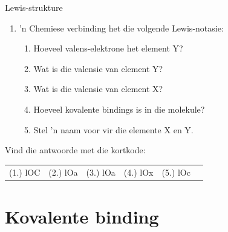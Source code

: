 \begin{exercises}{Lewis-strukture}
\begin{enumerate}[noitemsep, label=\textbf{\arabic*}. ]
                \label{m38701*uid38}\item 'n Chemiese verbinding het die volgende Lewis-notasie:
    \setcounter{subfigure}{0}
	\begin{figure}[H] %
\begin{center}
\end{center}
 \end{figure}       \label{m38701*id141181}\begin{enumerate}[noitemsep, label=\textbf{\alph*}. ] 
            \label{m38701*uid39}\item Hoeveel valens-elektrone het element $\text{Y}$?
\label{m38701*uid40}\item Wat is die valensie van element $\text{Y}$?
\label{m38701*uid41}\item Wat is die valensie van element $\text{X}$?
\label{m38701*uid42}\item Hoeveel kovalente bindings is in die molekule?
\label{m38701*uid43}\item Stel 'n naam voor vir die elemente $\text{X}$ en $\text{Y}$.
\end{enumerate}
                \end{enumerate}
  \label{m38701**end}
\par {} Vind die antwoorde met die kortkode:
 \par \begin{tabular}[h]{cccccc}
 (1.) lOC  &  (2.) lOa  &  (3.) lOa  &  (4.) lOx  &  (5.) lOc  & \end{tabular}
\end{exercises}
    \label{m38704*cid5}
            \section{Kovalente binding}
            \nopagebreak
            \label{m38704*uid6}
